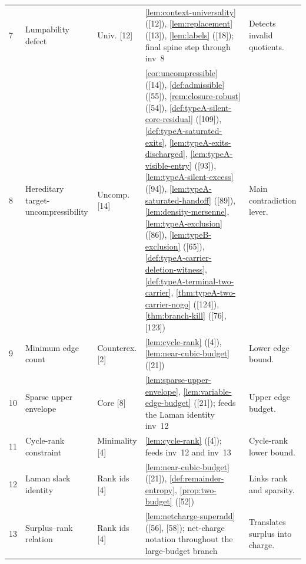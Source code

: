 \documentclass[11pt]{article}
\begin{document}
{\begin{longtable}{C{0.032\textwidth} L{0.145\textwidth} L{0.105\textwidth} L{0.50\textwidth} L{0.155\textwidth}}
7 & Lumpability defect & Univ. {[12]} & \cref{lem:context-universality} ([12]), \cref{lem:replacement} ([13]), \cref{lem:labels} ([18]); final spine step through inv~8 & Detects invalid quotients. \\
8 & Hereditary target-uncompressibility & Uncomp. {[14]} & \cref{cor:uncompressible} ([14]), \cref{def:admissible} ([55]), \cref{rem:closure-robust} ([54]), \cref{def:typeA-silent-core-residual} ([109]), \cref{def:typeA-saturated-exits}, \cref{lem:typeA-exits-discharged}, \cref{lem:typeA-visible-entry} ([93]), \cref{lem:typeA-silent-excess} ([94]), \cref{lem:typeA-saturated-handoff} ([89]), \cref{lem:density-mersenne}, \cref{lem:typeA-exclusion} ([86]), \cref{lem:typeB-exclusion} ([65]), \cref{def:typeA-carrier-deletion-witness}, \cref{def:typeA-terminal-two-carrier}, \cref{thm:typeA-two-carrier-nogo} ([124]), \cref{thm:branch-kill} ([76], [123]) & Main contradiction lever. \\
9 & Minimum edge count & Counterex. {[2]} & \cref{lem:cycle-rank} ([4]), \cref{lem:near-cubic-budget} ([21]) & Lower edge bound. \\
10 & Sparse upper envelope & Core {[8]} & \cref{lem:sparse-upper-envelope}, \cref{lem:variable-edge-budget} ([21]); feeds the Laman identity inv~12 & Upper edge budget. \\
11 & Cycle-rank constraint & Minimality {[4]} & \cref{lem:cycle-rank} ([4]); feeds inv~12 and inv~13 & Cycle-rank lower bound. \\
12 & Laman slack identity & Rank ids {[4]} & \cref{lem:near-cubic-budget} ([21]), \cref{def:remainder-entropy}, \cref{prop:two-budget} ([52]) & Links rank and sparsity. \\
13 & Surplus--rank relation & Rank ids {[4]} & \cref{lem:netcharge-superadd} ([56], [58]); net-charge notation throughout the large-budget branch & Translates surplus into charge. \\

\end{longtable}}
\end{document}
